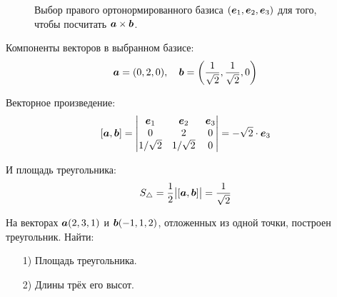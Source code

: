 \documentclass[a4paper,12pt]{article}
\begin{document}
\begin{solution}
\begin{figure}[h]
      \caption{Выбор правого ортонормированного базиса $(\boldsymbol e_1, \boldsymbol e_2, \boldsymbol e_3)$ для того, чтобы посчитать $\bds a \hm\times \bds b$.}
      \label{fig:a-and-b-from-one-point-with-basis}
    \end{figure}
    
    Компоненты векторов в выбранном базисе:
    \[
      \boldsymbol a = (0, 2, 0),\quad \boldsymbol b = \left(\frac{1}{\sqrt{2}}, \frac{1}{\sqrt{2}}, 0\right)
    \]
    
    Векторное произведение:
    \[
      [\boldsymbol a, \boldsymbol b] = \begin{vmatrix}
        \boldsymbol e_1   & \boldsymbol e_2   & \boldsymbol e_3\\
        0          & 2          & 0\\
        1/\sqrt{2} & 1/\sqrt{2} & 0\\
      \end{vmatrix} = -\sqrt{2} \cdot \boldsymbol e_3
    \]
    
    И площадь треугольника:
    \[
      S_{\triangle} = \frac{1}{2} \bigl|[\boldsymbol a, \boldsymbol b]\bigr| = \frac{1}{\sqrt{2}}
    \]
  \end{solution}
  
  
  \begin{problem}[3.8(1)]
    На векторах $\boldsymbol a(2, 3, 1)$ и $\boldsymbol b(-1, 1, 2)$, отложенных из одной точки, построен треугольник.
    Найти:
    \begin{itemize}
      \item[1)] Площадь треугольника.
      \item[2)] Длины трёх его высот.
    \end{itemize}
  \end{problem}
  
\end{document}
